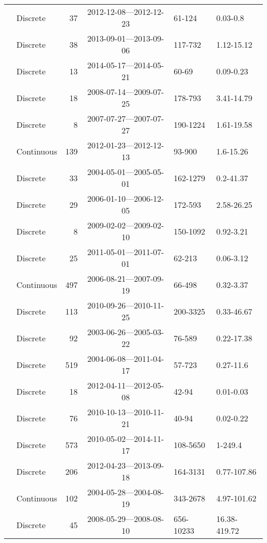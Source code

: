 \begin{longtable}{llrcll}
  \citet{Galgani2016} & Discrete &  37 & 2012-12-08---2012-12-23 & 61-124 & 0.03-0.8 \\ 
  \citet{Goncalves2015} & Discrete &  38 & 2013-09-01---2013-09-06 & 117-732 & 1.12-15.12 \\ 
  \citet{Gonnelli2016} & Discrete &  13 & 2014-05-17---2014-05-21 & 60-69 & 0.09-0.23 \\ 
  \citet{Griffin2011} & Discrete &  18 & 2008-07-14---2009-07-25 & 178-793 & 3.41-14.79 \\ 
  \citet{Gueguen2011} & Discrete &   8 & 2007-07-27---2007-07-27 & 190-1224 & 1.61-19.58 \\ 
  \citet{Heinz2015} & Continuous & 139 & 2012-01-23---2012-12-13 & 93-900 & 1.6-15.26 \\ 
  \citet{Helms2008} & Discrete &  33 & 2004-05-01---2005-05-01 & 162-1279 & 0.2-41.37 \\ 
  \citet{Hernes2008} & Discrete &  29 & 2006-01-10---2006-12-05 & 172-593 & 2.58-26.25 \\ 
  \citet{Hong2012} & Discrete &   8 & 2009-02-02---2009-02-10 & 150-1092 & 0.92-3.21 \\ 
  \citet{Hur2014} & Discrete &  25 & 2011-05-01---2011-07-01 & 62-213 & 0.06-3.12 \\ 
  \citet{kattegat} & Continuous & 497 & 2006-08-21---2007-09-19 & 66-498 & 0.32-3.37 \\ 
  \citet{Kellerman2015} & Discrete & 113 & 2010-09-26---2010-11-25 & 200-3325 & 0.33-46.67 \\ 
  \citet{Kowalczuk2010} & Discrete &  92 & 2003-06-26---2005-03-22 & 76-589 & 0.22-17.38 \\ 
  \citet{Kowalczuk2010a} & Discrete & 519 & 2004-06-08---2011-04-17 & 57-723 & 0.27-11.6 \\ 
  \citet{Kowalczuk2012} & Discrete &  18 & 2012-04-11---2012-05-08 & 42-94 & 0.01-0.03 \\ 
  \citet{Kowalczuk2013} & Discrete &  76 & 2010-10-13---2010-11-21 & 40-94 & 0.02-0.22 \\ 
  \citet{Lambert2015a} & Discrete & 573 & 2010-05-02---2014-11-17 & 108-5650 & 1-249.4 \\ 
  \citet{Loken2016} & Discrete & 206 & 2012-04-23---2013-09-18 & 164-3131 & 0.77-107.86 \\ 
  \citet{lter2004} & Continuous & 102 & 2004-05-28---2004-08-19 & 343-2678 & 4.97-101.62 \\ 
  \citet{lter2008} & Discrete &  45 & 2008-05-29---2008-08-10 & 656-10233 & 16.38-419.72 \\ 

\end{longtable}
